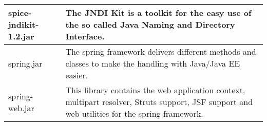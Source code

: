 \begin{center}
\begin{longtable}{|p{}|p{}|}
\hline 
spice-jndikit-1.2.jar & The JNDI Kit is a toolkit for the easy use of the so called Java Naming and Directory Interface.\\
\hline 
spring.jar & The spring framework delivers different methods and classes to make the handling with Java/Java EE easier.\\
\hline 
spring-web.jar & This library contains the web application context, multipart resolver, Struts support, JSF support and web utilities for the spring framework.\\
\hline 
\end{longtable}
\label{tabular:libraries}
\end{center}
